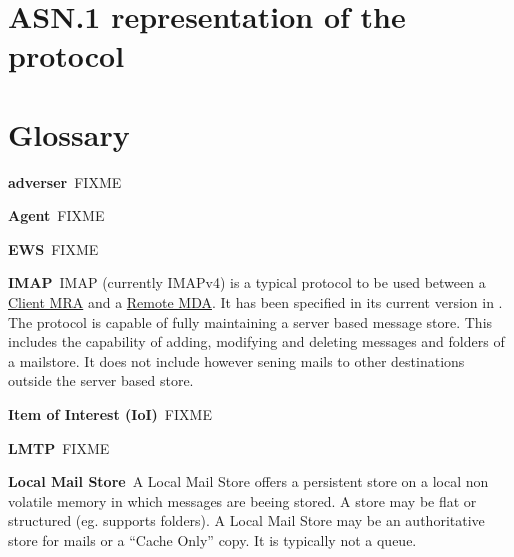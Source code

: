 \documentclass[10pt,a4paper,appendixprefix,twocolumn,draft]{scrbook}
\newenvironment{entry}{\par\leavevmode\hangpara{1.5mm}{1}\ignorespaces}{\RaggedRight\par}
\newcommand*{\mainentry}[2]{{\bfseries{#1\label{def:#1}}}~#2\par}
\newcommand*{\defref}[1]{\hyperref[def:#1]{#1}}
\begin{document}
\chapter{ASN.1 representation of the protocol\label{app:asnone}}
 
\twocolumn


\chapter{Glossary}

\begin{entry}
  \mainentry{adverser}{FIXME}
\end{entry}

\begin{entry}
  \mainentry{Agent}{FIXME}
\end{entry}

\begin{entry}
  \mainentry{EWS}{FIXME}
\end{entry}

\begin{entry}
  \mainentry{IMAP}{IMAP (currently IMAPv4) is a typical protocol to be used between a \defref{Client MRA} and a \defref{Remote MDA}. It has been specified in its current version in \cite{RFC3501}. The protocol is capable of fully maintaining a server based message store. This includes the capability of adding, modifying and deleting messages and folders of a mailstore. It does not include however sening mails to other destinations outside the server based store.}
\end{entry}

\begin{entry}
	\mainentry{Item of Interest (IoI)}{FIXME}
\end{entry}

\begin{entry}
  \mainentry{LMTP}{FIXME}
\end{entry}

\begin{entry}
  \mainentry{Local Mail Store}{A Local Mail Store offers a persistent store on a local non volatile memory in which messages are beeing stored. A store may be flat or structured (eg. supports folders). A Local Mail Store may be an authoritative store for mails or a ``Cache Only'' copy. It is typically not a queue.}
\end{entry}
\end{document}
